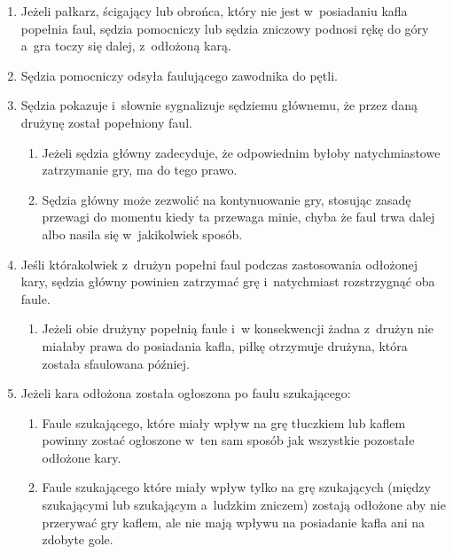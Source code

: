 \documentclass[12pt,a4paper]{article}
\renewcommand{\paragraph}[1]{
  \oldparagraph{#1}%
  \leftskip2cm
}
\begin{document}
\paragraph{Ogłaszanie odłożonej kary}

\begin{enumerate}
	\item
	      Jeżeli pałkarz, ścigający lub obrońca, który nie jest w~posiadaniu
	      kafla popełnia faul, sędzia pomocniczy lub sędzia zniczowy podnosi
	      rękę do góry a~gra toczy się dalej, z~odłożoną karą.
	\item
	      Sędzia pomocniczy odsyła faulującego zawodnika do pętli.
	\item
	      Sędzia pokazuje i~słownie sygnalizuje sędziemu głównemu, że przez
	      daną drużynę został popełniony faul.

	      \begin{enumerate}
		      \item
		            Jeżeli sędzia główny zadecyduje, że odpowiednim byłoby
		            natychmiastowe zatrzymanie gry, ma do tego prawo.
		      \item
		            Sędzia główny może zezwolić na kontynuowanie gry, stosując zasadę
		            przewagi do momentu kiedy ta przewaga minie, chyba że faul trwa
		            dalej albo nasila się w~jakikolwiek sposób.
	      \end{enumerate}
	\item
	      Jeśli którakolwiek z~drużyn popełni faul podczas zastosowania odłożonej kary, sędzia główny powinien zatrzymać grę i~natychmiast
	      rozstrzygnąć oba faule.

	      \begin{enumerate}
		      \item
		            Jeżeli obie drużyny popełnią faule i~w konsekwencji żadna z~drużyn
		            nie miałaby prawa do posiadania kafla, piłkę otrzymuje drużyna,
		            która została sfaulowana później.
	      \end{enumerate}
	\item
	      Jeżeli kara odłożona została ogłoszona po faulu szukającego:

	      \begin{enumerate}
		      \item
		            Faule szukającego, które miały wpływ na grę tłuczkiem lub kaflem
		            powinny zostać ogłoszone w~ten sam sposób jak wszystkie pozostałe
		            odłożone kary.
		      \item
		            Faule szukającego które miały wpływ tylko na grę szukających (między
		            szukającymi lub szukającym a~ludzkim zniczem) zostają odłożone aby
		            nie przerywać gry kaflem, ale nie mają wpływu na posiadanie kafla
		            ani na zdobyte gole.
	      \end{enumerate}
\end{enumerate}
\end{document}

